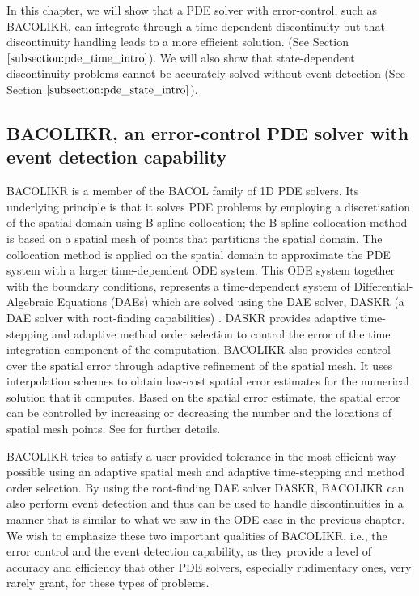 In this chapter, we will show that a PDE solver with error-control, such as BACOLIKR, can integrate through a time-dependent discontinuity but that discontinuity handling leads to a more efficient solution.
(See Section $\ref{subsection:pde_time_intro}$). We will also show that state-dependent discontinuity problems cannot be accurately solved without event detection (See Section $\ref{subsection:pde_state_intro}$).

\subsection{BACOLIKR, an error-control PDE solver with event detection capability}
\label{subsection:pde_software}
BACOLIKR \cite{bacolikr} is a member of the BACOL family of 1D PDE solvers. Its underlying principle is that it solves PDE problems  by employing a discretisation of the spatial domain using B-spline collocation; the B-spline collocation method is based on a spatial mesh of points that partitions the spatial domain. The collocation method is applied on the spatial domain to approximate the PDE system with a larger time-dependent ODE system. This ODE system together with the boundary conditions, represents a time-dependent system of Differential-Algebraic Equations (DAEs) which are solved using the DAE solver, DASKR (a DAE solver with root-finding capabilities) \cites{MR1298625}{MR1618796}. DASKR provides adaptive time-stepping and adaptive method order selection to control the error of the time integration component of the computation. BACOLIKR also provides control over the spatial error through adaptive refinement of the spatial mesh. It uses interpolation schemes to obtain low-cost spatial error estimates for the numerical solution that it computes. Based on the spatial error estimate, the spatial error can be controlled by increasing or decreasing the number and the locations of spatial mesh points. See \cite{bacolikr} for further details.

BACOLIKR tries to satisfy a user-provided tolerance in the most efficient way possible using an adaptive spatial mesh and adaptive time-stepping and method order selection. By using the root-finding DAE solver DASKR, BACOLIKR can also perform event detection and thus can be used to handle discontinuities in a manner that is similar to what we saw in the ODE case in the previous chapter. We wish to emphasize these two important qualities of BACOLIKR, i.e., the error control and the event detection capability, as they provide a level of accuracy and efficiency that other PDE solvers, especially rudimentary ones, very rarely grant, for these types of problems.

